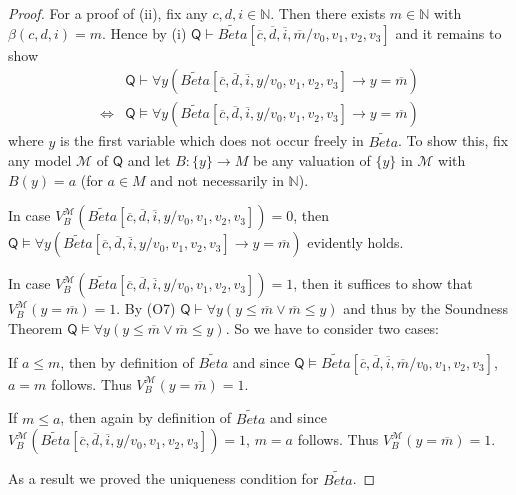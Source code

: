 \begin{proof}
For a proof of (ii), fix any $c,d,i \in \mathbb{N}$. Then there exists $m \in \mathbb{N}$ with $\beta(c,d,i) = m$. Hence by (i) $\mathsf{Q} \vdash \widetilde{\mathit{Beta}}[\overline{c}, \overline{d}, \overline{i}, \overline{m}/v_0, v_1, v_2, v_3]$ and it remains to show \begin{align*}
&\mathsf{Q} \vdash \forall y (\widetilde{\mathit{Beta}}[\overline{c}, \overline{d}, \overline{i}, y/v_0, v_1, v_2, v_3] \rightarrow  y = \overline{m}) \\
\Leftrightarrow &\mathsf{Q} \vDash \forall y (\widetilde{\mathit{Beta}}[\overline{c}, \overline{d}, \overline{i}, y/v_0, v_1, v_2, v_3] \rightarrow  y = \overline{m}) 
\end{align*} where $y$ is the first variable which does not occur freely in $\widetilde{\mathit{Beta}}$. To show this, fix any model $\mathcal{M}$ of $\mathsf{Q}$ and let $B: \lbrace y \rbrace \rightarrow M$ be any valuation of $\lbrace y \rbrace$ in $\mathcal{M}$ with $B(y) = a$ (for $a \in M$ and not necessarily in $\mathbb{N}$).

In case $V_B^\mathcal{M}(\widetilde{\mathit{Beta}}[\overline{c}, \overline{d}, \overline{i}, y/v_0, v_1, v_2, v_3])= 0$, then $\mathsf{Q} \vDash \forall y (\widetilde{\mathit{Beta}}[\overline{c}, \overline{d}, \overline{i}, y/v_0, v_1, v_2, v_3] \rightarrow  y = \overline{m})$ evidently holds.

In case $V_B^\mathcal{M}(\widetilde{\mathit{Beta}}[\overline{c}, \overline{d}, \overline{i}, y/v_0, v_1, v_2, v_3])= 1$, then it suffices to show that $V_B^\mathcal{M}(y = \overline{m})=1$. By (O7) $\mathsf{Q} \vdash \forall y(y \le \overline{m} \vee \overline{m} \le y)$ and thus by the Soundness Theorem $\mathsf{Q} \vDash \forall y(y \le \overline{m} \vee \overline{m} \le y).$ So we have to consider two cases:

If $a \le m$, then by definition of $\widetilde{\mathit{Beta}}$ and since $\mathsf{Q} \vDash \widetilde{\mathit{Beta}}[\overline{c}, \overline{d}, \overline{i}, \overline{m}/v_0, v_1, v_2, v_3]$, $a = m$ follows. Thus $V_B^\mathcal{M}(y = \overline{m})=1$.
 
If $m \le a$, then again by definition of $\widetilde{\mathit{Beta}}$ and since $V_B^\mathcal{M}(\widetilde{\mathit{Beta}}[\overline{c}, \overline{d}, \overline{i}, y/v_0, v_1, v_2, v_3])= 1$, $m = a$ follows. Thus $V_B^\mathcal{M}(y = \overline{m})=1$.

As a result we proved the uniqueness condition for $\widetilde{\mathit{Beta}}$.

\end{proof}


